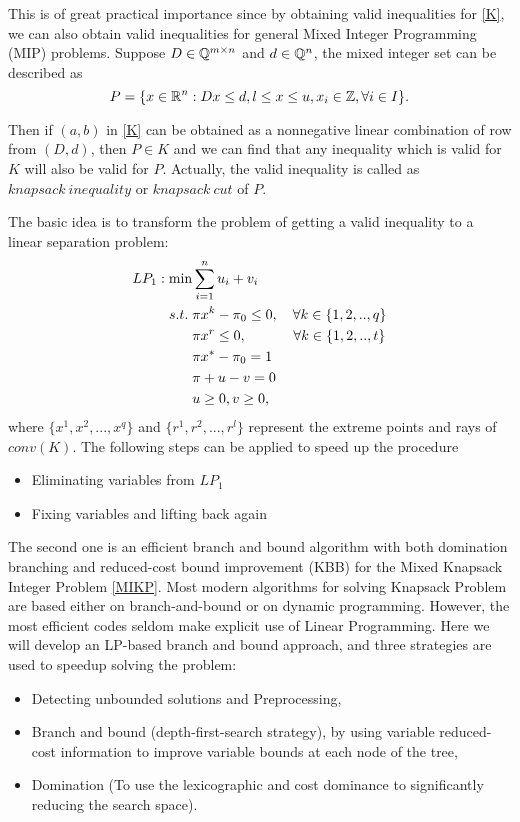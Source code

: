 \documentclass[a4paper,11pt]{article}
\begin{document}
This is of great practical importance since by obtaining valid inequalities for \eqref{K}, we can also obtain valid inequalities for general Mixed Integer Programming 
(MIP) problems. Suppose $D\in \mathbb{Q}^{m\times n}$ and $d\in \mathbb{Q}^n$, the mixed integer set can be described as
\begin{equation}\label{P}
 P=\{x\in \mathbb{R}^n: Dx\leq d, l\leq x\leq u, x_i\in \mathbb{Z}, \forall i \in I\}.
\end{equation}

Then if $(a,b)$ in \eqref{K} can be obtained as a nonnegative linear combination of row from $(D,d)$, then $P\in K$ and we can find that any inequality
 which is valid for  $K$ will also be valid for $P$. Actually, the valid inequality is called as $knapsack~inequality$ or $knapsack~cut$ of $P$.
 
The basic idea is to transform the problem of getting a valid inequality to a linear separation problem:
\begin{align}
LP_1: \min &\sum_{i=1}^{n} u_i+v_i \notag\\
s.t. \;  & \pi x^k-\pi_0\leq 0,  \quad \forall k\in\{1,2,..,q\} \notag\\
& \pi x^r\leq 0, \quad~ \qquad \forall  k\in\{1,2,..,t\} \notag\\
& \pi x^*-\pi_0 = 1 \notag\\
& \pi+u-v = 0 \notag\\
&u\geq 0, v\geq 0\notag,
\end{align}
where $\{x^1, x^2,...,x^q\}$ and $\{r^1,r^2,..., r^l\}$ represent the extreme points and rays of $conv(K)$. The following steps can be applied to speed up the procedure
\begin{itemize}
 \item Eliminating variables from $LP_1$
 \item Fixing variables and lifting back again
\end{itemize}

The second one is an efficient branch and bound algorithm with both domination branching and reduced-cost bound improvement (KBB) for the Mixed 
Knapsack Integer Problem \eqref{MIKP}. Most modern algorithms for solving Knapsack Problem are based either on branch-and-bound or on dynamic 
programming. However, the most efficient codes seldom make explicit use of Linear Programming. Here we will develop an LP-based branch and bound 
approach, and three strategies are used to speedup solving the problem:
\begin{itemize}
 \item Detecting unbounded solutions and Preprocessing,
 \item Branch and bound (depth-first-search strategy), by using variable reduced-cost information to improve variable bounds at each node of the tree,
 \item Domination (To use the lexicographic and cost dominance to significantly reducing the search space). 
\end{itemize}
\end{document}
